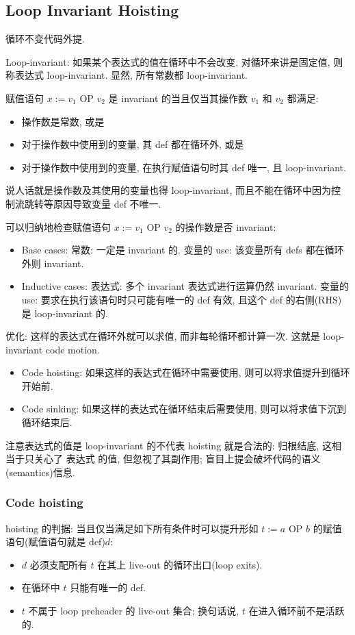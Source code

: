 \subsection{Loop Invariant Hoisting}
循环不变代码外提. 

Loop-invariant: 如果某个表达式的值在循环中不会改变, 对循环来讲是固定值, 则称表达式 loop-invariant. 显然, 所有常数都 loop-invariant. 

赋值语句 $x := v_1\text{ OP }v_2$  是 invariant 的当且仅当其操作数 $v_1$ 和 $v_2$ 都满足: 
\begin{itemize}
    \item 操作数是常数, 或是
    \item 对于操作数中使用到的变量, 其 def 都在循环外, 或是
    \item 对于操作数中使用到的变量, 在执行赋值语句时其 def 唯一, 且 loop-invariant.
\end{itemize}
说人话就是操作数及其使用的变量也得 loop-invariant, 而且不能在循环中因为控制流跳转等原因导致变量 def 不唯一. 

可以归纳地检查赋值语句 $x := v_1\text{ OP }v_2$ 的操作数是否 invariant:
\begin{itemize}
    \item Base cases:
    \subitem 常数: 一定是 invariant 的. 
    \subitem 变量的 use: 该变量所有 defs 都在循环外则 invariant.
    \item Inductive cases:
    \subitem 表达式: 多个 invariant 表达式进行运算仍然 invariant.
    \subitem 变量的 use: 要求在执行该语句时只可能有唯一的 def 有效, 且这个 def 的右侧(RHS) 是 loop-invariant 的. 
\end{itemize}

优化: 这样的表达式在循环外就可以求值, 而非每轮循环都计算一次. 这就是 loop-invariant code motion.
\begin{itemize}
    \item Code hoisting: 如果这样的表达式在循环中需要使用, 则可以将求值提升到循环开始前. 
    \item Code sinking: 如果这样的表达式在循环结束后需要使用, 则可以将求值下沉到循环结束后. 
\end{itemize}

注意表达式的值是 loop-invariant 的不代表 hoisting 就是合法的: 归根结底, 这相当于只关心了 表达式 的值, 但忽视了其副作用; 盲目上提会破坏代码的语义(semantics)信息. 

\subsubsection{Code hoisting}
hoisting 的判据: 当且仅当满足如下所有条件时可以提升形如 $t := a\text{ OP }b$ 的赋值语句(赋值语句就是 def)$d$:
\begin{itemize}
    \item $d$ 必须支配所有 $t$ 在其上 live-out 的循环出口(loop exits).
    \item 在循环中 $t$ 只能有唯一的 def.
    \item $t$ 不属于 loop preheader 的 live-out 集合; 换句话说, $t$ 在进入循环前不是活跃的. 
\end{itemize}


